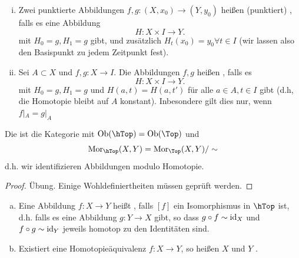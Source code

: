 \begin{definition}\label{def:homotopie-relativ-einer-menge}
    \begin{enumerate}[i)]
        \item 
    Zwei punktierte Abbildungen $f,g \colon  (X,x_0) \to  (Y,y_0)$ heißen (punktiert) , falls es eine Abbildung
    \[
    H \colon  X \times I \to  Y
    .\] 
    mit $H_0 = g, H_1 = g$ gibt, und zusätzlich $H_t(x_0) = y_0 \forall t\in I$ (wir lassen also den Basispunkt zu jedem Zeitpunkt fest).
\item Sei $A\subset X$ und $f,g\colon  X \to  I$. Die Abbildungen $f,g$ heißen  , falls es
    \[
    H \colon  X \times I \to  Y
    .\] 
    mit $H_0 = g, H_1 = g$ und $H(a,t) = H(a,t')$ für alle  $a\in A, t\in I$ gibt (d.h, die Homotopie bleibt auf $A$ konstant). Inbesondere gilt dies nur, wenn  $f|_A = g|_A$
    \end{enumerate}
\end{definition}

\begin{definition}[Homotopiekategorie]\label{def:homotopiekategorie}
    Die       ist die Kategorie mit $\Ob(\hTop) = \Ob(\Top)$ und 
    \[
        \Mor_{\hTop}(X,Y) = \Mor_{\Top}(X,Y) / \sim
    \]
    d.h. wir identifizieren Abbildungen modulo Homotopie.
\end{definition}

\begin{proof}
    Übung. Einige Wohldefiniertheiten müssen geprüft werden.
\end{proof}

\begin{definition}[Homotopieäquivalenz]\label{def:homotopieäquivalenz}
    \begin{enumerate}[a)]
        \item 
            Eine Abbildung $f\colon  X \to  Y$ heißt , falls $[f]$ ein Isomorphismus in  $\hTop$ ist, d.h. falls es eine Abbildung $g\colon  Y \to  X$ gibt, so dass $g \circ  f \sim  \mathrm{id}_X$ und $f \circ  g \sim \mathrm{id}_Y$ jeweils homotop zu den Identitäten sind.
\item Existiert eine Homotopieäquivalenz $f\colon  X \to Y$, so heißen $X$ und  $Y$  . 
    \end{enumerate}
\end{definition}

